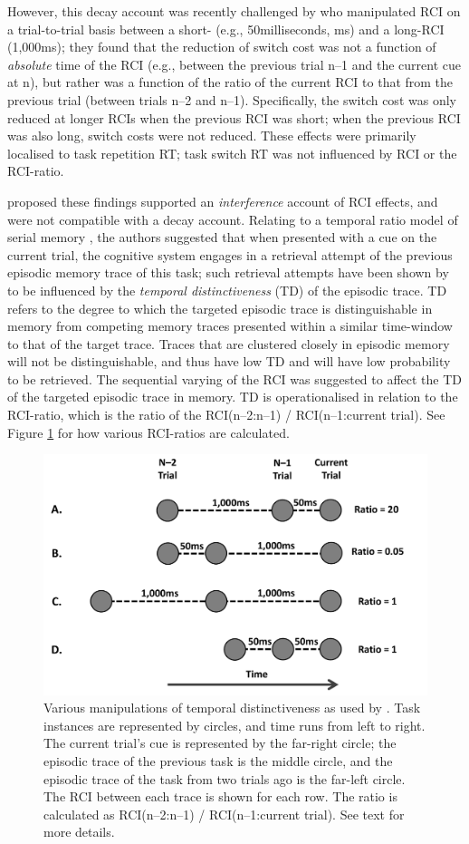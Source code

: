 \documentclass[a4paper, jou, natbib]{apa6}
\begin{document}
However, this decay account was recently challenged by \cite{Horoufchin2011a} who manipulated RCI on a trial-to-trial basis between a short- (e.g., 50milliseconds, ms) and a long-RCI (1,000ms); they found that the reduction of switch cost was not a function of \emph{absolute} time of the RCI (e.g., between the previous trial n--1 and the current cue at n), but rather was a function of the ratio of the current RCI to that from the previous trial (between trials n--2 and n--1). Specifically, the switch cost was only reduced at longer RCIs when the previous RCI was short; when the previous RCI was also long, switch costs were not reduced. These effects were primarily localised to task repetition RT; task switch RT was not influenced by RCI or the RCI-ratio.

\cite{Horoufchin2011a} proposed these findings supported an \emph{interference} account of RCI effects, and were not compatible with a decay account. Relating to a temporal ratio model of serial memory \citep[SIMPLE][]{Brown2007}, the authors suggested that when presented with a cue on the current trial, the cognitive system engages in a retrieval attempt of the previous episodic memory trace of this task; such retrieval attempts have been shown by \cite{Brown2007} to be influenced by the \emph{temporal distinctiveness} (TD) of the episodic trace. TD refers to the degree to which the targeted episodic trace is distinguishable in memory from competing memory traces presented within a similar time-window to that of the target trace. Traces that are clustered closely in episodic memory will not be distinguishable, and thus have low TD and will have low probability to be retrieved. The sequential varying of the RCI was suggested to affect the TD of the targeted episodic trace in memory. TD is operationalised in relation to the RCI-ratio, which is the ratio of the RCI(n--2:n--1) / RCI(n--1:current trial). See Figure \ref{fig:tdAccount} for how various RCI-ratios are calculated. 

\begin{figure} 
\begin{center}
\includegraphics[width = 0.5 \textwidth]{Images/tdAccount.pdf}
\caption{Various manipulations of temporal distinctiveness as used by \cite{Horoufchin2011, Horoufchin2011a}. Task instances are represented by circles, and time runs from left to right. The current trial's cue is represented by the far-right circle; the episodic trace of the previous task is the middle circle, and the episodic trace of the task from two trials ago is the far-left circle. The RCI between each trace is shown for each row. The ratio is calculated as RCI(n--2:n--1) / RCI(n--1:current trial). See text for more details.}
\label{fig:tdAccount}
\end{center}
\end{figure}
\end{document}
